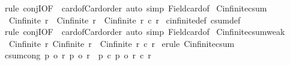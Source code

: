 \begin{isabellebody}
\ {\isacharparenleft}{\kern0pt}rule\ conjI{\isacharbrackleft}{\kern0pt}OF\ {\isacharunderscore}{\kern0pt}\ card{\isacharunderscore}{\kern0pt}of{\isacharunderscore}{\kern0pt}Card{\isacharunderscore}{\kern0pt}order{\isacharbrackright}{\kern0pt}{\isacharparenright}{\kern0pt}\ {\isacharparenleft}{\kern0pt}auto\ simp{\isacharcolon}{\kern0pt}\ Field{\isacharunderscore}{\kern0pt}card{\isacharunderscore}{\kern0pt}of{\isacharparenright}{\kern0pt}%
\endisatagproof
{\isafoldproof}%
%
\isadelimproof
\isanewline
%
\endisadelimproof
\isanewline
{}\isamarkupfalse%
\ Cinfinite{\isacharunderscore}{\kern0pt}csum{\isacharcolon}{\kern0pt}\isanewline
\ \ {\isachardoublequoteopen}Cinfinite\ r{}\ {\isasymor}\ Cinfinite\ r{}\ {\isasymLongrightarrow}\ Cinfinite\ {\isacharparenleft}{\kern0pt}r{}\ {\isacharplus}{\kern0pt}c\ r{}{\isacharparenright}{\kern0pt}{\isachardoublequoteclose}\isanewline
%
\isadelimproof
%
\endisadelimproof
%
\isatagproof
{}\isamarkupfalse%
\ cinfinite{\isacharunderscore}{\kern0pt}def\ csum{\isacharunderscore}{\kern0pt}def\ \isamarkupfalse%
\ {\isacharparenleft}{\kern0pt}rule\ conjI{\isacharbrackleft}{\kern0pt}OF\ {\isacharunderscore}{\kern0pt}\ card{\isacharunderscore}{\kern0pt}of{\isacharunderscore}{\kern0pt}Card{\isacharunderscore}{\kern0pt}order{\isacharbrackright}{\kern0pt}{\isacharparenright}{\kern0pt}\ {\isacharparenleft}{\kern0pt}auto\ simp{\isacharcolon}{\kern0pt}\ Field{\isacharunderscore}{\kern0pt}card{\isacharunderscore}{\kern0pt}of{\isacharparenright}{\kern0pt}%
\endisatagproof
{\isafoldproof}%
%
\isadelimproof
\isanewline
%
\endisadelimproof
\isanewline
{}\isamarkupfalse%
\ Cinfinite{\isacharunderscore}{\kern0pt}csum{\isacharunderscore}{\kern0pt}weak{\isacharcolon}{\kern0pt}\isanewline
\ \ {\isachardoublequoteopen}{\isasymlbrakk}Cinfinite\ r{}{\isacharsemicolon}{\kern0pt}\ Cinfinite\ r{}{\isasymrbrakk}\ {\isasymLongrightarrow}\ Cinfinite\ {\isacharparenleft}{\kern0pt}r{}\ {\isacharplus}{\kern0pt}c\ r{}{\isacharparenright}{\kern0pt}{\isachardoublequoteclose}\isanewline
%
\isadelimproof
%
\endisadelimproof
%
\isatagproof
{}\isamarkupfalse%
\ {\isacharparenleft}{\kern0pt}erule\ Cinfinite{\isacharunderscore}{\kern0pt}csum{}{\isacharparenright}{\kern0pt}%
\endisatagproof
{\isafoldproof}%
%
\isadelimproof
\isanewline
%
\endisadelimproof
\isanewline
{}\isamarkupfalse%
\ csum{\isacharunderscore}{\kern0pt}cong{\isacharcolon}{\kern0pt}\ {\isachardoublequoteopen}{\isasymlbrakk}p{}\ {\isacharequal}{\kern0pt}o\ r{}{\isacharsemicolon}{\kern0pt}\ p{}\ {\isacharequal}{\kern0pt}o\ r{}{\isasymrbrakk}\ {\isasymLongrightarrow}\ p{}\ {\isacharplus}{\kern0pt}c\ p{}\ {\isacharequal}{\kern0pt}o\ r{}\ {\isacharplus}{\kern0pt}c\ r{}{\isachardoublequoteclose}\isanewline

\end{isabellebody}
